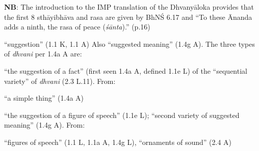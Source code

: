 \documentclass[10pt]{article}
\begin{document}
\begin{multicols}{2}
	\vspace{1mm}
	\textbf{NB}: The introduction to the IMP translation of the Dhvanyāloka provides that the first 8 sthāyibhāva and rasa are given by BhNŚ 6.17 and ``To these Ānanda adds a ninth, the rasa of peace (\textit{śānta}).'' (p.16)


	\begin{enumerate}[
			leftmargin=0em,
			rightmargin=0em,
		]
		\setlength{\itemsep}{0.15em}

		 ``suggestion'' (1.1 K, 1.1 A) Also ``suggested meaning'' (1.4g A). The three types of \textit{dhvani} per 1.4a A are:
		\begin{enumerate}

			 ``the suggestion of a fact'' (first seen 1.4a A, defined 1.1e L) of the ``sequential variety'' of \textit{dhvani} (2.3 L.11).
			From:
			\begin{itemize}
				 ``a simple thing'' (1.4a A)
			\end{itemize}

			 ``the suggestion of a figure of speech'' (1.1e L);
			``second variety of suggested meaning'' (1.4g A).
			From:
			\begin{itemize}
				 ``figures of speech'' (1.1 L, 1.1a A, 1.4g L), ``ornaments of sound'' (2.4 A)
			\end{itemize}


\end{enumerate}
\end{enumerate}
\end{multicols}
\end{document}
